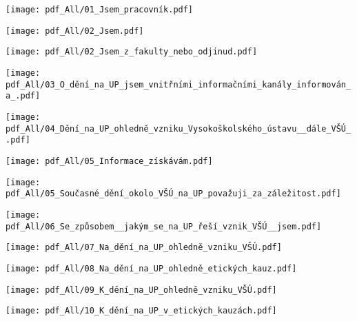 {  \centerline{\texttt{[image: pdf\_All/01\_Jsem\_pracovník.pdf]}  } }


{  \centerline{\texttt{[image: pdf\_All/02\_Jsem.pdf]}  } }


{  \centerline{\texttt{[image: pdf\_All/02\_Jsem\_z\_fakulty\_nebo\_odjinud.pdf]}  } }


{  \centerline{\texttt{[image: pdf\_All/03\_O\_dění\_na\_UP\_jsem\_vnitřními\_informačními\_kanály\_informován\_a\_.pdf]}  } }


{  \centerline{\texttt{[image: pdf\_All/04\_Dění\_na\_UP\_ohledně\_vzniku\_Vysokoškolského\_ústavu\_\_dále\_VŠÚ\_.pdf]}  } }


{  \centerline{\texttt{[image: pdf\_All/05\_Informace\_získávám.pdf]}  } }


{  \centerline{\texttt{[image: pdf\_All/05\_Současné\_dění\_okolo\_VŠÚ\_na\_UP\_považuji\_za\_záležitost.pdf]}  } }


{  \centerline{\texttt{[image: pdf\_All/06\_Se\_způsobem\_\_jakým\_se\_na\_UP\_řeší\_vznik\_VŠÚ\_\_jsem.pdf]}  } }


{  \centerline{\texttt{[image: pdf\_All/07\_Na\_dění\_na\_UP\_ohledně\_vzniku\_VŠÚ.pdf]}  } }


{  \centerline{\texttt{[image: pdf\_All/08\_Na\_dění\_na\_UP\_ohledně\_etických\_kauz.pdf]}  } }


{  \centerline{\texttt{[image: pdf\_All/09\_K\_dění\_na\_UP\_ohledně\_vzniku\_VŠÚ.pdf]}  } }


{  \centerline{\texttt{[image: pdf\_All/10\_K\_dění\_na\_UP\_v\_etických\_kauzách.pdf]}  } }


